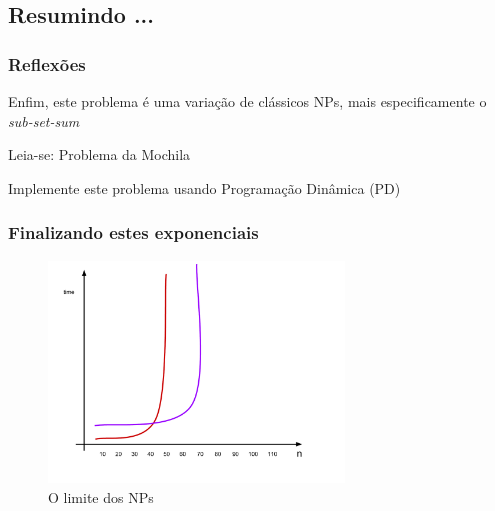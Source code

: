 \documentclass{beamer}
\begin{document}



\subsection{Resumindo ... }

\begin{frame}
\frametitle{Reflexões}
\begin{block}{}   %
\begin{flushleft}

\vspace{1cm}
 \textsf{Enfim, este problema é uma variação de clássicos
NPs, mais especificamente o \textit{sub-set-sum}}

\vspace{1cm}
 \textsf{Leia-se: Problema da Mochila}


\vspace{1cm}
 \textsf{Implemente este problema usando Programação Dinâmica (PD)}

      \end{flushleft}

    \end{block}
  \end{frame}




\begin{frame}
\frametitle{Finalizando estes exponenciais}

\begin{figure}[h!b]
\begin{center}
\includegraphics[width=0.7\textwidth , height=0.7\textheight]{Execution-Time-NP-01.pdf}
\caption{O limite dos NPs}
\label{fig_Execution-Time-NP-01}
\end{center}
\end{figure}


\end{frame}
\end{document}
